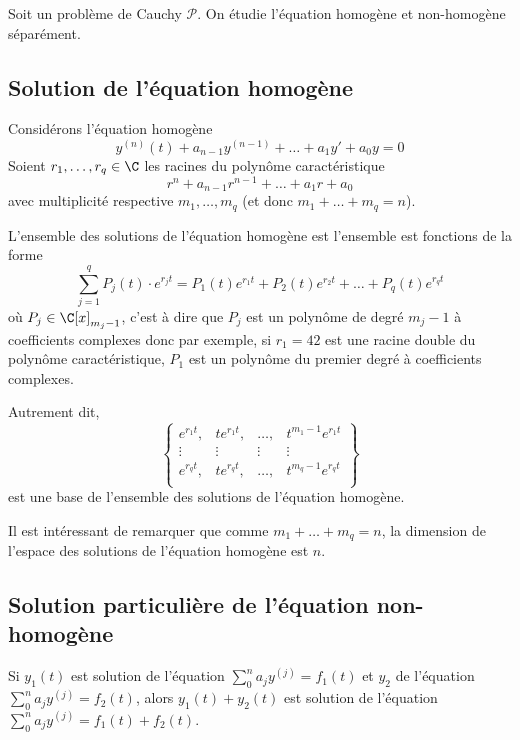 Soit un problème de Cauchy $\mathcal{P}$. On étudie l'équation homogène et non-homogène séparément.

\subsection{Solution de l'équation homogène}
\begin{mytheo}
	Considérons l'équation homogène
	\[ y^{(n)}(t) + a_{n-1}y^{(n-1)} + \dots + a_1y' + a_0y = 0 \]
	Soient $r_1, \dots, r_q \in \C$ les racines du polynôme caractéristique
	\[ r^n + a_{n-1}r^{n-1} + \dots + a_1r + a_0 \]
	avec multiplicité respective $m_1, \dots, m_q$ (et donc $m_1 + \dots + m_q = n$).

	L'ensemble des solutions de l'équation homogène est l'ensemble est fonctions de la forme
    \[ \sum_{j=1}^{q} P_j(t) \cdot e^{r_j t} =
    P_1(t)e^{r_1 t} + P_2(t)e^{r_2 t} + \ldots + P_q(t)e^{r_q t} \]
	où $P_j \in \C[x]_{m_j -1}$, c'est à dire que $P_j$ est un polynôme
    de degré $m_j-1$ à coefficients complexes donc par exemple,
    si $r_1=42$ est une racine double du polynôme caractéristique,
    $P_1$ est un polynôme du premier degré à coefficients complexes.

	Autrement dit,
	\[ \begin{Bmatrix}
		e^{r_1t}, & te^{r_1t}, & \dots, & t^{m_1-1}e^{r_1t}\\
		\vdots & \vdots & \vdots & \vdots\\
		e^{r_qt}, & te^{r_qt}, & \dots, & t^{m_q-1}e^{r_qt}\\
	\end{Bmatrix} \]
	est une base de l'ensemble des solutions de l'équation homogène.

	Il est intéressant de remarquer que comme $m_1 + \dots + m_q = n$,
	la dimension de l'espace des solutions de l'équation homogène est $n$.
\end{mytheo}

\subsection{Solution particulière de l'équation non-homogène}
\begin{myprop}
	Si $y_1(t)$ est solution de l'équation $\sum_0^n a_j y^{(j)} = f_1(t)$ et $y_2$ de l'équation $\sum_0^n a_j y^{(j)} = f_2(t)$,
	alors $y_1(t) + y_2(t)$ est solution de l'équation $\sum_0^n a_j y^{(j)} = f_1(t) + f_2(t)$.
\end{myprop}

